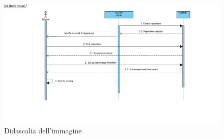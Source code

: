     \begin{figure}[H]
  \includegraphics[width=1\linewidth]{SequenceDiagram/Battle setup.png} 
  \caption{Didascalia dell'immagine}
  \label{fig:immagine}
\end{figure}





